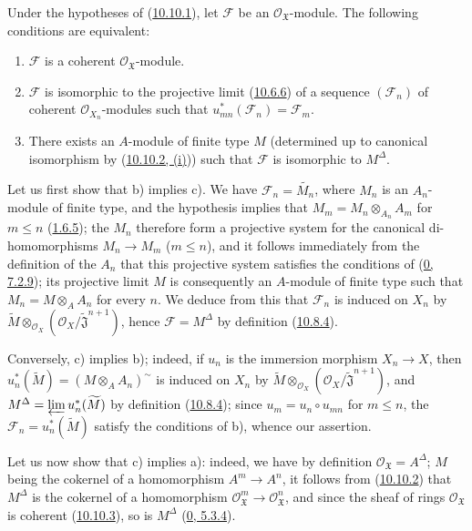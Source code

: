 \begin{proposition}[10.10.5]
\label{I.10.10.5}
Under the hypotheses of (\hyperref[I.10.10.1]{10.10.1}), let
$\mathscr{F}$ be an $\mathscr{O}_{\mathfrak{X}}$-module. The following
conditions are equivalent:
\begin{enumerate}
  \item[a)] $\mathscr{F}$ is a coherent $\mathscr{O}_{\mathfrak{X}}$-module.
  \item[b)] $\mathscr{F}$ is isomorphic to the projective limit
    (\hyperref[I.10.6.6]{10.6.6}) of a sequence $(\mathscr{F}_n)$ of
    coherent $\mathscr{O}_{X_n}$-modules such that
    $u_{mn}^*(\mathscr{F}_n)=\mathscr{F}_m$.
  \item[c)] There exists an $A$-module of finite type $M$ (determined up
    to canonical isomorphism by
    (\hyperref[I.10.10.2]{10.10.2, (i)})) such that $\mathscr{F}$ is
    isomorphic to $M^\Delta$.
\end{enumerate}
\end{proposition}

Let us first show that b) implies c). We have
$\mathscr{F}_n=\widetilde{M_n}$, where $M_n$ is an $A_n$-module of
finite type, and the hypothesis implies that
$M_m=M_n\otimes_{A_n}A_m$ for $m\leq n$
(\hyperref[I.1.6.5]{1.6.5}); the $M_n$ therefore form a projective
system for the canonical di-homomorphisms $M_n\to M_m$
($m\leq n$), and it follows immediately from the definition of the $A_n$
that this projective system satisfies the conditions of
(\hyperref[0.7.2.9]{0, 7.2.9}); its projective limit $M$ is
consequently an $A$-module of finite type such that
$M_n=M\otimes_A A_n$ for every $n$. We deduce from this that
$\mathscr{F}_n$ is induced on $X_n$ by
$\widetilde M\otimes_{\mathscr{O}_X}
(\mathscr{O}_X/\widetilde{\mathfrak{J}}^{n+1})$, hence
$\mathscr{F}=M^\Delta$ by definition
(\hyperref[I.10.8.4]{10.8.4}).

Conversely, c) implies b); indeed, if $u_n$ is the immersion morphism
$X_n\to X$, then
$u_n^*(\widetilde M)=(M\otimes_A A_n)^{\sim}$ is induced on $X_n$ by
$\widetilde M\otimes_{\mathscr{O}_X}
(\mathscr{O}_X/\widetilde{\mathfrak{J}}^{n+1})$, and
$M^\Delta=\varprojlim u_n^*(\widetilde M)$ by definition
(\hyperref[I.10.8.4]{10.8.4}); since
$u_m=u_n\circ u_{mn}$ for $m\leq n$, the
$\mathscr{F}_n=u_n^*(\widetilde M)$ satisfy the conditions of b),
whence our assertion.

Let us now show that c) implies a): indeed, we have by definition
$\mathscr{O}_{\mathfrak{X}}=A^\Delta$; $M$ being the cokernel of a
homomorphism $A^m\to A^n$, it follows from
(\hyperref[I.10.10.2]{10.10.2}) that $M^\Delta$ is the cokernel of a
homomorphism
$\mathscr{O}_{\mathfrak{X}}^m\to\mathscr{O}_{\mathfrak{X}}^n$, and
since the sheaf of rings $\mathscr{O}_{\mathfrak{X}}$ is coherent
(\hyperref[I.10.10.3]{10.10.3}), so is $M^\Delta$
(\hyperref[0.5.3.4]{0, 5.3.4}).

